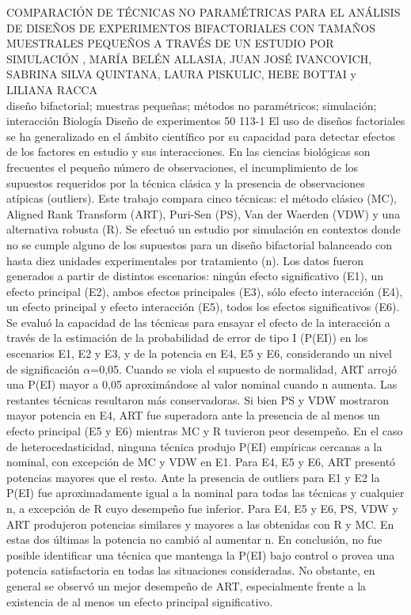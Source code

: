 \A
{COMPARACIÓN DE TÉCNICAS NO PARAMÉTRICAS PARA EL ANÁLISIS DE DISEÑOS DE EXPERIMENTOS BIFACTORIALES CON TAMAÑOS MUESTRALES PEQUEÑOS A TRAVÉS DE UN ESTUDIO POR SIMULACIÓN}
{, MARÍA BELÉN ALLASIA, JUAN JOSÉ IVANCOVICH, SABRINA SILVA QUINTANA, LAURA PISKULIC, HEBE BOTTAI y LILIANA RACCA}
{
\\}
{diseño bifactorial; muestras pequeñas; métodos no paramétricos; simulación; interacción} 
 {Biología} 
 {Diseño de experimentos} 
 {50} 
 {113-1}
{El uso de diseños factoriales se ha generalizado en el ámbito científico por su capacidad para detectar efectos de los factores en estudio y sus interacciones. En las ciencias biológicas son frecuentes el pequeño número de observaciones, el incumplimiento de los supuestos requeridos por la técnica clásica y la presencia de observaciones atípicas (outliers). Este trabajo compara cinco técnicas: el método clásico (MC), Aligned Rank Transform (ART), Puri-Sen (PS), Van der Waerden (VDW) y una alternativa robusta (R). Se efectuó un estudio por simulación en contextos donde no se cumple alguno de los supuestos para un diseño bifactorial balanceado con hasta diez unidades experimentales por tratamiento (n). Los datos fueron generados a partir de distintos escenarios: ningún efecto significativo (E1), un efecto principal (E2), ambos efectos principales (E3), sólo efecto interacción (E4), un efecto principal y efecto interacción (E5), todos los efectos significativos (E6). Se evaluó la capacidad de las técnicas para ensayar el efecto de la interacción a través de la estimación de la probabilidad de error de tipo I (P(EI)) en los escenarios E1, E2 y E3, y de la potencia en E4, E5 y E6, considerando un nivel de significación $\alpha$=0,05. Cuando se viola el supuesto de normalidad, ART arrojó una P(EI) mayor a 0,05 aproximándose al valor nominal cuando n aumenta. Las restantes técnicas resultaron más conservadoras. Si bien PS y VDW mostraron mayor potencia en E4, ART fue superadora ante la presencia de al menos un efecto principal (E5 y E6) mientras MC y R tuvieron peor desempeño. En el caso de heterocedasticidad, ninguna técnica produjo P(EI) empíricas cercanas a la nominal, con excepción de MC y VDW en E1. Para E4, E5 y E6, ART presentó potencias mayores que el resto. Ante la presencia de outliers para E1 y E2 la P(EI) fue aproximadamente igual a la nominal para todas las técnicas y cualquier n, a excepción de R cuyo desempeño fue inferior. Para E4, E5 y E6, PS, VDW y ART produjeron potencias similares y mayores a las obtenidas con R y MC. En estas dos últimas la potencia no cambió al aumentar n. En conclusión, no fue posible identificar una técnica que mantenga la P(EI) bajo control o provea una potencia satisfactoria en todas las situaciones consideradas. No obstante, en general se observó un mejor desempeño de ART, especialmente frente a la existencia de al menos un efecto principal significativo. }
